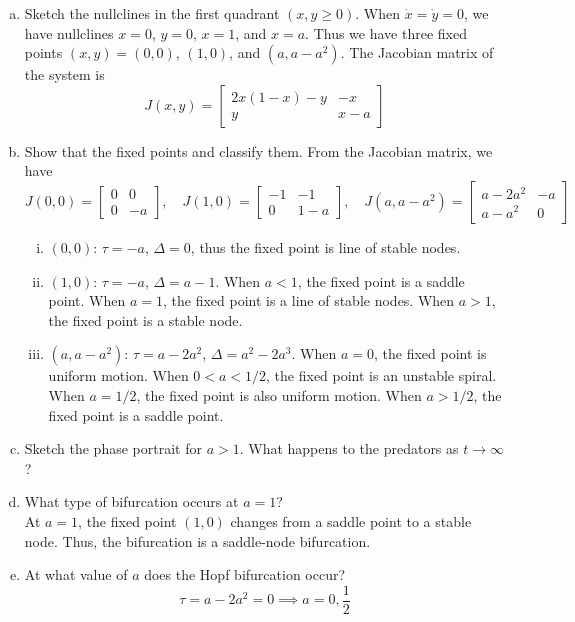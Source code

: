 \documentclass[12pt]{exam}
\begin{document}
\begin{enumerate}[(a)]
	\item Sketch the nullclines in the first quadrant $(x, y \geq 0)$.
	When $\dot{x} = \dot{y} = 0$, we have nullclines $x = 0$, $y = 0$, $x = 1$, and $x=a$. Thus we have three fixed points $(x,y) = (0,0)$, $(1,0)$, and $(a,a-a^2)$. The Jacobian matrix of the system is
	\[ J(x,y) = \begin{bmatrix}
		2x(1-x) - y & -x \\
		y & x-a
	\end{bmatrix} \]

	\item Show that the fixed points and classify them.
	From the Jacobian matrix, we have
	\[ J(0,0) = \begin{bmatrix}
		0 & 0 \\
		0 & -a
	\end{bmatrix}, \quad J(1,0) = \begin{bmatrix}
		-1 & -1 \\
		0 & 1-a
	\end{bmatrix}, \quad J(a,a-a^2) = \begin{bmatrix}
		a-2a^2 & -a \\
		a-a^2 & 0
	\end{bmatrix} \]
	\begin{enumerate}[(i)]
		\item $(0,0)$: $\tau = -a$, $\Delta = 0$, thus the fixed point is line of stable nodes.
		\item $(1,0)$: $\tau = -a$, $\Delta = a-1$. When $a < 1$, the fixed point is a saddle point. When $a = 1$, the fixed point is a line of stable nodes. When $a > 1$, the fixed point is a stable node.
		\item $(a,a-a^2)$: $\tau = a-2a^2$, $\Delta = a^2 - 2a^3$. When $a=0$, the fixed point is uniform motion. When $0 < a < 1/2$, the fixed point is an unstable spiral. When $a = 1/2$, the fixed point is also uniform motion. When $a > 1/2$, the fixed point is a saddle point.	
	\end{enumerate}

	\item Sketch the phase portrait for $a >1$. What happens to the predators as $t \to \infty$?
	
	\item What type of bifurcation occurs at $a = 1$? \\
	At $a = 1$, the fixed point $(1,0)$ changes from a saddle point to a stable node. Thus, the bifurcation is a saddle-node bifurcation.

	\item At what value of $a$ does the Hopf bifurcation occur? 
	\[ \tau = a-2a^2 = 0 \implies a = 0, \frac{1}{2} \]


\end{enumerate}
\end{document}
